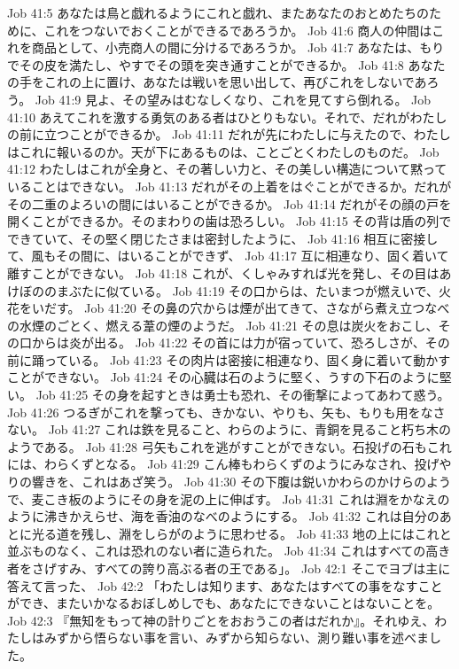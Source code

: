 Job 41:5  あなたは鳥と戯れるようにこれと戯れ、またあなたのおとめたちのために、これをつないでおくことができるであろうか。
Job 41:6  商人の仲間はこれを商品として、小売商人の間に分けるであろうか。
Job 41:7  あなたは、もりでその皮を満たし、やすでその頭を突き通すことができるか。
Job 41:8  あなたの手をこれの上に置け、あなたは戦いを思い出して、再びこれをしないであろう。
Job 41:9  見よ、その望みはむなしくなり、これを見てすら倒れる。
Job 41:10  あえてこれを激する勇気のある者はひとりもない。それで、だれがわたしの前に立つことができるか。
Job 41:11  だれが先にわたしに与えたので、わたしはこれに報いるのか。天が下にあるものは、ことごとくわたしのものだ。
Job 41:12  わたしはこれが全身と、その著しい力と、その美しい構造について黙っていることはできない。
Job 41:13  だれがその上着をはぐことができるか。だれがその二重のよろいの間にはいることができるか。
Job 41:14  だれがその顔の戸を開くことができるか。そのまわりの歯は恐ろしい。
Job 41:15  その背は盾の列でできていて、その堅く閉じたさまは密封したように、
Job 41:16  相互に密接して、風もその間に、はいることができず、
Job 41:17  互に相連なり、固く着いて離すことができない。
Job 41:18  これが、くしゃみすれば光を発し、その目はあけぼののまぶたに似ている。
Job 41:19  その口からは、たいまつが燃えいで、火花をいだす。
Job 41:20  その鼻の穴からは煙が出てきて、さながら煮え立つなべの水煙のごとく、燃える葦の煙のようだ。
Job 41:21  その息は炭火をおこし、その口からは炎が出る。
Job 41:22  その首には力が宿っていて、恐ろしさが、その前に踊っている。
Job 41:23  その肉片は密接に相連なり、固く身に着いて動かすことができない。
Job 41:24  その心臓は石のように堅く、うすの下石のように堅い。
Job 41:25  その身を起すときは勇士も恐れ、その衝撃によってあわて惑う。
Job 41:26  つるぎがこれを撃っても、きかない、やりも、矢も、もりも用をなさない。
Job 41:27  これは鉄を見ること、わらのように、青銅を見ること朽ち木のようである。
Job 41:28  弓矢もこれを逃がすことができない。石投げの石もこれには、わらくずとなる。
Job 41:29  こん棒もわらくずのようにみなされ、投げやりの響きを、これはあざ笑う。
Job 41:30  その下腹は鋭いかわらのかけらのようで、麦こき板のようにその身を泥の上に伸ばす。
Job 41:31  これは淵をかなえのように沸きかえらせ、海を香油のなべのようにする。
Job 41:32  これは自分のあとに光る道を残し、淵をしらがのように思わせる。
Job 41:33  地の上にはこれと並ぶものなく、これは恐れのない者に造られた。
Job 41:34  これはすべての高き者をさげすみ、すべての誇り高ぶる者の王である」。
Job 42:1  そこでヨブは主に答えて言った、
Job 42:2  「わたしは知ります、あなたはすべての事をなすことができ、またいかなるおぼしめしでも、あなたにできないことはないことを。
Job 42:3  『無知をもって神の計りごとをおおうこの者はだれか』。それゆえ、わたしはみずから悟らない事を言い、みずから知らない、測り難い事を述べました。
